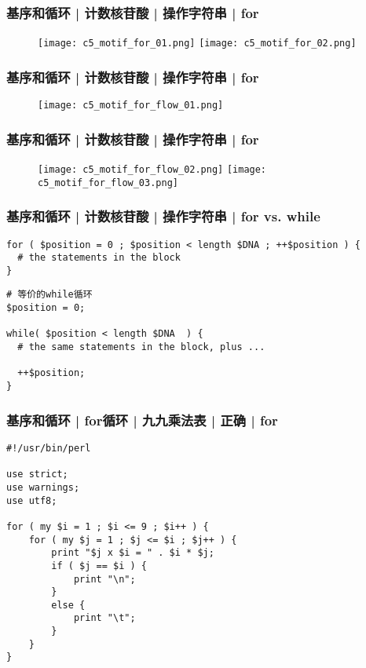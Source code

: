 \begin{frame}
  \frametitle{基序和循环 | 计数核苷酸 | 操作字符串 | \alert{for}}
  \begin{figure}
    \centering
    \texttt{[image: c5\_motif\_for\_01.png]}
    \vspace{0.5em}
    \texttt{[image: c5\_motif\_for\_02.png]}
  \end{figure}
\end{frame}

\begin{frame}
  \frametitle{基序和循环 | 计数核苷酸 | 操作字符串 | \alert{for}}
  \begin{figure}
    \centering
    \texttt{[image: c5\_motif\_for\_flow\_01.png]}
  \end{figure}
\end{frame}

\begin{frame}
  \frametitle{基序和循环 | 计数核苷酸 | 操作字符串 | \alert{for}}
  \begin{figure}
    \centering
    \texttt{[image: c5\_motif\_for\_flow\_02.png]}
    \vspace{0.5em}
    \texttt{[image: c5\_motif\_for\_flow\_03.png]}
  \end{figure}
\end{frame}

\begin{frame}[fragile]
  \frametitle{基序和循环 | 计数核苷酸 | 操作字符串 | \alert{for vs. while}}
\begin{lstlisting}
for ( $position = 0 ; $position < length $DNA ; ++$position ) {
  # the statements in the block
}
\end{lstlisting}
\pause
\begin{lstlisting}
# 等价的while循环
$position = 0;

while( $position < length $DNA  ) {
  # the same statements in the block, plus ...

  ++$position;
}
\end{lstlisting}
\end{frame}

\begin{frame}[fragile]
  \frametitle{基序和循环 | for循环 | 九九乘法表 | 正确 | for}
\begin{lstlisting}[basicstyle=\small\tt,numberstyle=\footnotesize]
#!/usr/bin/perl 

use strict;
use warnings;
use utf8;

for ( my $i = 1 ; $i <= 9 ; $i++ ) {
    for ( my $j = 1 ; $j <= $i ; $j++ ) {
        print "$j x $i = " . $i * $j;
        if ( $j == $i ) {
            print "\n";
        }
        else {
            print "\t";
        }
    }
}
\end{lstlisting}
\end{frame}

